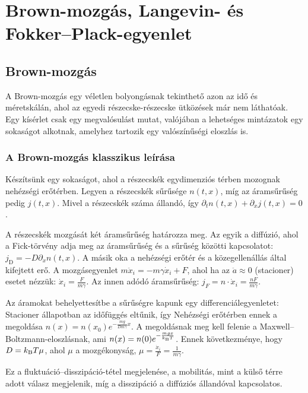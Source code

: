 \chapter{Brown-mozg\'as, Langevin- \'es Fokker--Plack-egyenlet}
 
 \section{Brown-mozgás}
  
  A Brown-mozgás egy véletlen bolyongásnak tekinthető azon az idő és méretskálán, ahol az egyedi részecske-részecske ütközések már nem láthatóak. Egy kísérlet csak egy megvalósulást mutat, valójában a lehetséges mintázatok egy sokaságot alkotnak, amelyhez tartozik egy valószínűségi eloszlás is.
  
  \subsection{A Brown-mozgás klasszikus leírása}
   
   Készítsünk egy sokaságot, ahol a részecskék egydimenziós térben mozognak nehézségi erőtérben. Legyen a részecskék sűrűsége $n(t,x)$, míg az áramsűrűség pedig $j(t,x)$. Mivel a részecskék száma állandó, így $\partial_t n(t,x)+\partial_x j(t,x)=0$. 
   
   A részecskék mozgását két áramsűrűség határozza meg. Az egyik a diffúzió, ahol a Fick-törvény adja meg az áramsűrűség és a sűrűség közötti kapcsolatot: $j_\text{D}=-D\partial_x n(t,x)$. A másik oka a nehézségi erőtér és a közegellenállás által kifejtett erő. A mozgásegyenlet $m\ddot x_i=-m\gamma\dot x_i+F$, ahol ha az $\ddot a\approx 0$ (stacioner) esetet nézzük: $\dot x_i=\frac{F}{m\gamma}$. Az innen adódó áramsűrűség: $j_ F=n\cdot \dot x_i=\frac{nF}{m\gamma}$. 
   
   Az áramokat behelyettesítbe a sűrűségre kapunk egy differenciálegyenletet:
   Stacioner állapotban az időfüggés eltűnik, így 
   Nehézségi erőtérben ennek a megoldása $n(x)=n(x_0)e^{-\frac{mg}{D m\gamma}x}$. A megoldásnak meg kell felenie a Maxwell--Boltz\-mann-eloszlásnak, ami $n(x)=n(0)e^{-\frac{mgx}{k_\text{B} T}}$. Ennek következménye, hogy $D=k_\text{B} T\mu$, ahol $\mu$ a mozgékonyság, $\mu=\frac{\dot x_i}{F}=\frac{1}{m\gamma}$.
   
   Ez a fluktuáció--disszipáció-tétel megjelenése, a mobilitás, mint a külső térre adott válasz megjelenik, míg a disszipáció a diffúziós állandóval kapcsolatos. 
   
